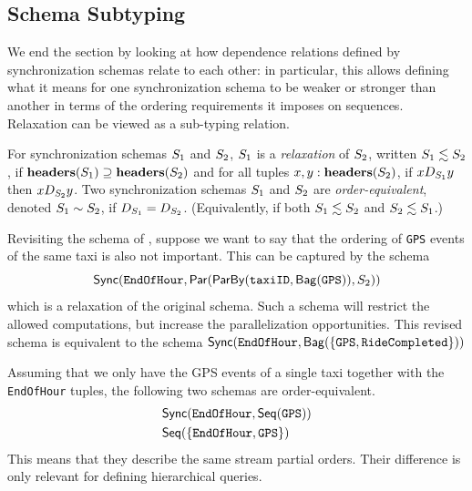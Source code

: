 
\subsection{Schema Subtyping}

We end the section by looking at how dependence relations defined
by synchronization schemas relate to each other: in particular, this allows defining what it means
for one synchronization schema to be weaker or stronger than another in terms of the ordering requirements it imposes on sequences.
Relaxation can be viewed as a sub-typing relation.

\begin{definition}
    \label{45:def:schema-relaxation}
    \label{45:def:schema-equivalence}
    For synchronization schemas $\ss_1$ and $\ss_2$,  $\ss_1$ is a \emph{relaxation} of $\ss_2$, written $\ss_1 \lesssim \ss_2$, if
    $\headers(\ss_1) \supseteq \headers(\ss_2)$
    and for all tuples $x, y: \headers(\ss_2)$,
    if $x D_{\ss_1} y$ then $x D_{\ss_2} y$.
    Two synchronization schemas $\ss_1$ and $\ss_2$ are \emph{order-equivalent}, denoted $\ss_1 \sim \ss_2$, if $D_{\ss_1} = D_{\ss_2}$.
    (Equivalently, if both $\ss_1 \lesssim \ss_2$ and $\ss_2 \lesssim \ss_1$.)
    \end{definition}

\begin{example}
Revisiting the schema of , suppose we want to say that
the ordering of \texttt{GPS} events of the same taxi is also not important.
This can be captured by the schema
$$
\hier
    {\texttt{EndOfHour}}
    {\parcomp
        {\keyby
            {\texttt{taxiID}}
            {\relleaf{\texttt{GPS}}}}
        {\ss_2}}
$$
which is a relaxation of the original schema.
Such a schema will
restrict the allowed computations, but increase the parallelization opportunities.
This revised schema is equivalent to the schema
$\hier{\texttt{EndOfHour}}{\relleaf{\{\texttt{GPS},\texttt{RideCompleted} \}}}$

Assuming that we only have the GPS events of a single taxi together with the \texttt{EndOfHour} tuples, the following two schemas are order-equivalent.
\begin{align*}
    & \hier
        { \texttt{EndOfHour}  }
        {\seqleaf
            {  \texttt{GPS} }} \\
    & \seqleaf
        {\{ \texttt{EndOfHour}, \texttt{GPS} \} }
\end{align*}
This means that they describe the same stream partial orders. Their difference is only relevant for defining hierarchical queries.
\end{example}

